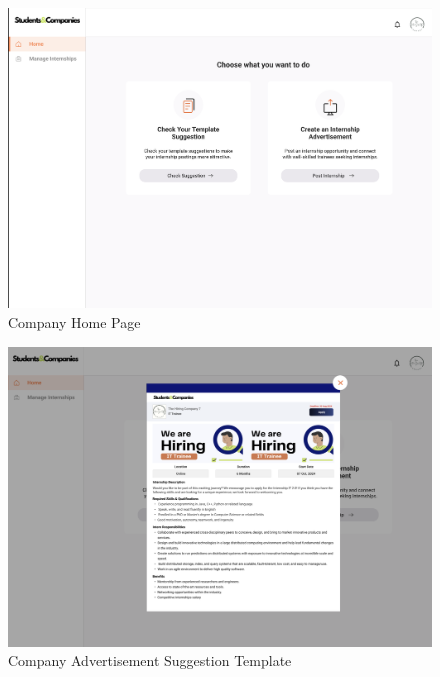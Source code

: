 \documentclass{article}
\begin{document}
\begin{figure}[H]
    \centering
    \includegraphics[scale = 0.42]{figures/UserInterfaces/Company/CompanyHome.png}
    \caption{Company Home Page}
     \centering
\end{figure}
\begin{figure}[H]
    \centering
    \includegraphics[scale = 0.40]{figures/UserInterfaces/Company/CompanySuggestion.png}
    \caption{Company Advertisement Suggestion Template}
     \centering
\end{figure}
\end{document}
